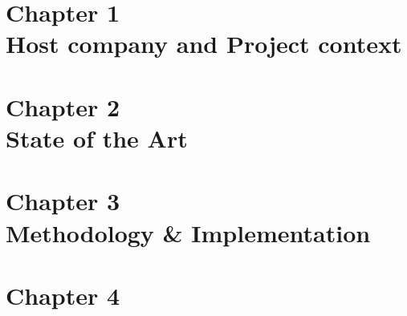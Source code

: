 \documentclass[a4paper,12pt,oneside]{report}
\begin{document}





\tableofcontents
\listoffigures
\listoftables




\pagestyle{fancy}

\newpage
{}



\part*{Chapter 1 \\Host company and Project context}

\part*{Chapter 2 \\State of the Art}

\part*{Chapter 3 \\Methodology \& Implementation}

\part*{Chapter 4 \\}

% 

\fancyhead[R]{}





\newpage

\end{document}

